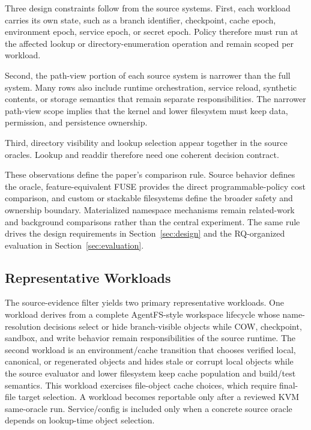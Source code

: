 Three design constraints follow from the source systems. First, each workload
carries its own state, such as a branch identifier, checkpoint, cache epoch,
environment epoch, service epoch, or secret epoch. Policy therefore must run at
the affected lookup or directory-enumeration operation and remain scoped per
workload.

Second, the path-view portion of each source system is narrower than the full
system. Many rows also include runtime orchestration, service reload,
synthetic contents, or storage semantics that remain separate responsibilities.
The narrower path-view scope implies that the kernel and lower filesystem must
keep data, permission, and persistence ownership.

Third, directory visibility and lookup selection appear together in the source
oracles. Lookup and readdir therefore need one coherent decision contract.

These observations define the paper's comparison rule. Source behavior defines
the oracle, feature-equivalent FUSE provides the direct programmable-policy cost
comparison, and custom or stackable filesystems define the broader safety and
ownership boundary. Materialized namespace mechanisms remain related-work and
background comparisons rather than the central experiment. The same rule drives
the design requirements in Section~\ref{sec:design} and the RQ-organized
evaluation in Section~\ref{sec:evaluation}.

\subsection{Representative Workloads}

The source-evidence filter yields two primary representative workloads. One
workload derives from a complete AgentFS-style workspace lifecycle whose
name-resolution decisions select or hide branch-visible objects while COW,
checkpoint, sandbox, and write behavior remain responsibilities of the source
runtime. The second workload is an environment/cache transition that chooses
verified local, canonical, or regenerated objects and hides stale or corrupt
local objects while the source evaluator and lower filesystem keep cache
population and build/test semantics. This workload exercises file-object cache
choices, which require final-file target selection. A workload becomes
reportable only after a reviewed KVM same-oracle run. Service/config is
included only when a concrete source oracle depends on lookup-time object
selection.
